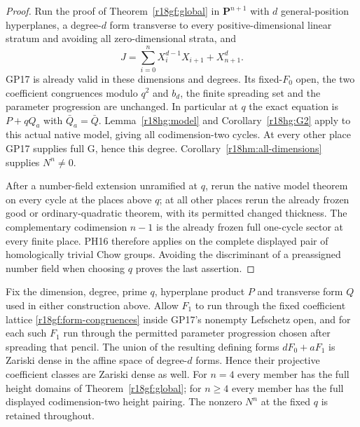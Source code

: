 \begin{proof}
Run the proof of Theorem~\ref{r18gf:global} in
$\mathbf P^{n+1}$ with $d$ general-position hyperplanes,
a degree-$d$ form transverse to every positive-dimensional
linear stratum and avoiding all zero-dimensional strata,
and
\[
                 J=\sum_{i=0}^{n}X_i^{d-1}X_{i+1}+X_{n+1}^d.
\]
GP17 is already valid in these dimensions and degrees.
Its fixed-$F_0$ open, the two coefficient congruences
modulo $q^2$ and $b_d$, the finite spreading set and
the parameter progression are unchanged.  In particular
at $q$ the exact equation is $P+qQ_a$ with
$\bar Q_a=\bar Q$.  Lemma~\ref{r18hg:model} and
Corollary~\ref{r18hg:G2} apply to this actual native
model, giving all codimension-two cycles.  At every
other place GP17 supplies full G, hence this degree.
Corollary~\ref{r18hm:all-dimensions} supplies $N^n\ne0$.

After a number-field extension unramified at $q$, rerun
the native model theorem on every cycle at the places
above $q$; at all other places rerun the already frozen
good or ordinary-quadratic theorem, with its permitted
changed thickness.  The complementary codimension
$n-1$ is the already frozen full one-cycle sector at
every finite place.  PH16 therefore applies on the
complete displayed pair of homologically trivial
Chow groups.  Avoiding the discriminant of a preassigned
number field when choosing $q$ proves the last assertion.
\end{proof}

\begin{corollary}
\label{r18gf:density}
Fix the dimension, degree, prime $q$, hyperplane product $P$
and transverse form $Q$ used in either construction above.
Allow $F_1$ to run through the fixed coefficient lattice
\eqref{r18gf:form-congruences} inside GP17's nonempty
Lefschetz open, and for each such $F_1$ run through the
permitted parameter progression chosen after spreading
that pencil.  The union of the resulting defining forms
$dF_0+aF_1$ is Zariski dense in the affine space of
degree-$d$ forms.  Hence their projective coefficient
classes are Zariski dense as well.
For $n=4$ every member has the full height domains of
Theorem~\ref{r18gf:global}; for $n\ge4$ every member has
the full displayed codimension-two height pairing.
The nonzero $N^n$ at the fixed $q$ is retained throughout.
\end{corollary}

